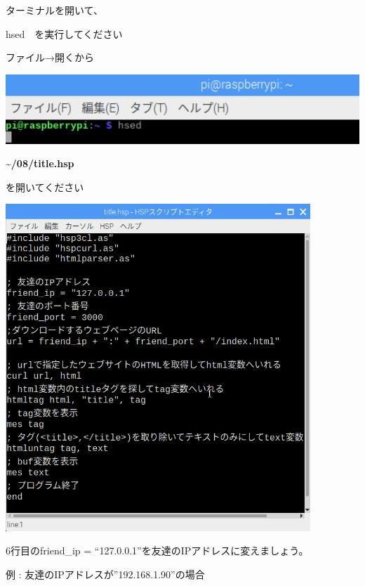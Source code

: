 \documentclass[a4paper,12pt,dvipdfmx]{jarticle}
\begin{document}
ターミナルを開いて、

hsed　を実行してください

ファイル→開くから

\begin{center}
\includegraphics[width=16.94cm]{textbook-img013.png}

\end{center}
\textbf{{\textasciitilde}/08/title.hsp}

を開いてください



\begin{center}
\includegraphics[width=11.472cm]{textbook-img014.png}

\end{center}

\bigskip


\bigskip

\clearpage
6行目のfriend\_ip =
“127.0.0.1”を友達のIPアドレスに変えましょう。


例 : 友達のIPアドレスが”192.168.1.90”の場合
\end{document}
